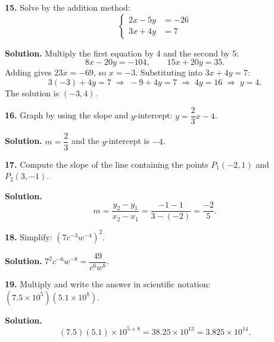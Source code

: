 \documentclass{ximera}
\begin{document}
\begin{problem}

\textbf{15.} Solve by the addition method:
\[
  \left\{\begin{aligned}
    2x-5y &= -26 \\
    3x+4y &= 7
  \end{aligned}\right.
\]

\begin{hint}
\textbf{Solution.} Multiply the first equation by 4 and the second by 5:
\[
  8x-20y=-104, \qquad 15x+20y=35 .
\]
Adding gives $23x=-69$, so $x=-3$. Substituting into $3x+4y=7$:
\[
  3(-3)+4y=7 \;\Longrightarrow\; -9+4y=7 \;\Longrightarrow\; 4y=16 \;\Longrightarrow\; y=4 .
\]
The solution is $(-3,4)$.
\end{hint}
\end{problem}

\begin{problem}

\textbf{16.} Graph by using the slope and $y$-intercept: $y=\dfrac{2}{3}x-4$.

\begin{hint}
\textbf{Solution.} $m=\dfrac{2}{3}$ and the $y$-intercept is $-4$.
\figbox{\gridsm}
\end{hint}
\end{problem}

\begin{problem}

\textbf{17.} Compute the slope of the line containing the points $P_{1}(-2,1)$ and
$P_{2}(3,-1)$.

\begin{hint}
\textbf{Solution.}
\[
  m=\frac{y_{2}-y_{1}}{x_{2}-x_{1}}=\frac{-1-1}{3-(-2)}=\frac{-2}{5}.
\]
\end{hint}
\end{problem}

\begin{problem}

\textbf{18.} Simplify: $\left(7c^{-3}w^{-4}\right)^{2}$.

\begin{hint}
\textbf{Solution.} $7^{2}c^{-6}w^{-8}=\dfrac{49}{c^{6}w^{8}}$.
\end{hint}
\end{problem}

\begin{problem}

\textbf{19.} Multiply and write the answer in scientific notation:
$\left(7.5\times 10^{5}\right)\left(5.1\times 10^{8}\right)$.

\begin{hint}
\textbf{Solution.}
\[
  (7.5)(5.1)\times 10^{5+8} = 38.25\times 10^{13} = 3.825\times 10^{14}.
\]
\end{hint}
\end{problem}
\end{document}
